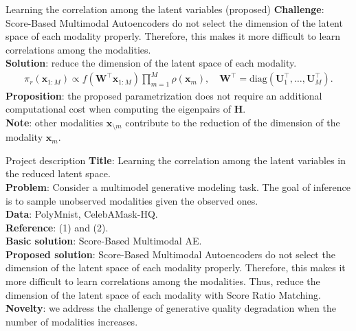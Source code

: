 \documentclass[aspectratio=169]{beamer}
\begin{document}
\begin{frame}{Learning the correlation among the latent variables (proposed)}
    \textbf{Challenge}: Score-Based Multimodal Autoencoders do not select the dimension of the latent
    space of each modality properly. Therefore, this makes it more difficult to learn correlations among the
    modalities. \\
    \textbf{Solution}: reduce the dimension of the latent space of each modality.
    \begin{align*}
        \pi_r(\mathbf{x}_{1:M}) \propto f(\mathbf{W}^\top\mathbf{x}_{1:M})\prod_{m=1}^M\rho(\mathbf{x}_m), \quad
        \mathbf{W}^\top = \mathrm{diag}(\mathbf{U}_1^\top, \ldots, \mathbf{U}_M^\top).
    \end{align*}
    \textbf{Proposition}: the proposed parametrization does not require an additional computational cost
    when computing the eigenpairs of $\mathbf{H}$. \\
    \textbf{Note}: other modalities $\mathbf{x}_{\setminus m}$ contribute to the reduction of the dimension of
    the modality $\mathbf{x}_m$.

\end{frame}


\begin{frame}{Project description}
    \textbf{Title}: Learning the correlation among the latent variables in the reduced latent space. \\
    \textbf{Problem}: Consider a multimodel generative modeling task. The goal of inference is to sample unobserved modalities
    given the observed ones. \\
    \textbf{Data}: PolyMnist, CelebAMask-HQ. \\
    \textbf{Reference}: (1) and (2). \\
    \textbf{Basic solution}: Score-Based Multimodal AE. \\
    \textbf{Proposed solution}: Score-Based Multimodal Autoencoders do not select the dimension of the latent
    space of each modality properly. Therefore, this makes it more difficult to learn correlations
    among the modalities. Thus, reduce the dimension of the latent space of each modality with Score Ratio Matching. \\
    \textbf{Novelty}: we address the challenge of generative quality degradation when the number of modalities increases.
\end{frame}
\end{document}
